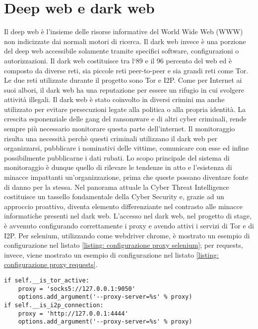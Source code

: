 \section{Deep web e dark web}
Il deep web è l'insieme delle risorse informative del World Wide Web (WWW) non indicizzate dai normali motori di ricerca. Il dark web invece è una porzione del deep web accessibile solamente tramite specifici software, configurazioni o autorizzazioni. Il dark web costituisce tra l`89 e il 96 percento del web ed è composto da diverse reti, sia piccole reti peer-to-peer e sia grandi reti come \gls{Tor}. Le due reti utilizzate durante il progetto sono \gls{Tor} e \gls{I2P}. \newline{}
Come per Internet ai suoi albori, il dark web ha una reputazione per essere un rifugio in cui svolgere attività illegali. Il dark web è stato coinvolto in diversi crimini ma anche utilizzato per evitare persecuzioni legate alla politica o alla propria identità. La crescita esponenziale delle gang del ransomware e di altri cyber criminali, rende sempre più necessario monitorare questa parte dell'internet. \newline{} Il monitoraggio risulta una necessità perchè questi criminali utilizzano il dark web per organizzarsi, pubblicare i nominativi delle vittime, comunicare con esse ed infine possibilmente pubblicarne i dati rubati. Lo scopo principale del sistema di monitoraggio è dunque quello di rilevare le tendenze in atto e l’esistenza di minacce impattanti un’organizzazione, prima che queste possano diventare fonte di danno per la stessa. Nel panorama attuale la Cyber Threat Intelligence costituisce un tassello fondamentale della Cyber Security e, grazie ad un approccio proattivo, diventa elemento differenziante nel contrasto alle minacce informatiche presenti nel dark web. \newline{}
L'accesso nel dark web, nel progetto di stage, è avvenuto configurando correttamente i proxy e avendo attivi i servizi di \gls{Tor} e di \gls{I2P}. Per selenium, utilizzando come webdriver chrome, è mostrato un esempio di configurazione nel listato \ref{listing: configurazione proxy selenium}; per requests, invece, viene mostrato un esempio di configurazione nel listato \ref{listing: configurazione proxy requests}.

\begin{lstlisting}[caption=Configurazione del proxy di selenium con webdriver chrome per l'accesso al dark web.,
	label=listing: configurazione proxy selenium]
if self.__is_tor_active:
    proxy = 'socks5://127.0.0.1:9050'
    options.add_argument('--proxy-server=%s' % proxy)
if self.__is_i2p_connection:
    proxy = 'http://127.0.0.1:4444'
    options.add_argument('--proxy-server=%s' % proxy)
\end{lstlisting}

